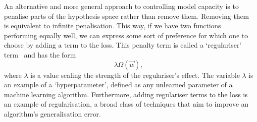 An alternative and more general approach to controlling model capacity is to penalise parts of the hypothesis space rather than remove them. Removing them is equivalent to infinite penalisation. This way, if we have two functions performing equally well, we can express some sort of preference for which one to choose by adding a term to the loss. This penalty term is called a `regulariser' term~\cite{DeepLearningBook} and has the form
\begin{equation}
    \lambda\Omega(\vec{w}),
\end{equation}
where $\lambda$ is a value scaling the strength of the regulariser's effect. The variable $\lambda$ is an example of a `hyperparameter', defined as any unlearned parameter of a machine learning algorithm. Furthermore, adding regulariser terms to the loss is an example of regularisation, a broad class of techniques that aim to improve an algorithm's generalisation error. 


